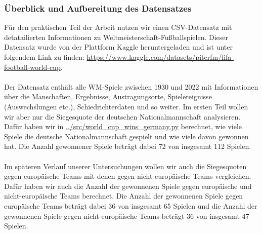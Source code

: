 \documentclass[a4paper,12pt]{article}
\begin{document}
\subsubsection{Überblick und Aufbereitung des Datensatzes}
Für den praktischen Teil der Arbeit nutzen wir einen CSV-Datensatz mit detatailierten Informationen zu Weltmeisterschaft-Fußballspielen. 
Dieser Datensatz wurde von der Plattform Kaggle heruntergeladen und ist unter folgendem Link zu finden: \url{https://www.kaggle.com/datasets/piterfm/fifa-football-world-cup}\parencite{FIFAWorldCupData}. \\\\
Der Datensatz enthält alle WM-Spiele zwischen 1930 und 2022 mit Informationen über die Manschaften, Ergebnisse, Austragungsorte, Spielereignisse (Auswechslungen etc.), Schiedrichterdaten und so weiter. Im ersten Teil wollen wir aber nur die Siegesquote der deutschen Nationalmannschaft analysieren. Dafür haben wir in \url{../src/world_cup_wins_germany.py} berechnet, wie viele Spiele die deutsche Nationalmannschaft gespielt und wie viele davon gewonnen hat. Die Anzahl gewonnener Spiele beträgt dabei 72 von insgesamt 112 Spielen. \\\\
Im späteren Verlauf unserer Untersuchungen wollen wir auch die Siegesquoten gegen europäische Teams mit denen gegen nicht-europäische Teams vergleichen. Dafür haben wir auch die Anzahl der gewonnenen Spiele gegen europäische und nicht-europäische Teams berechnet. Die Anzahl der gewonnenen Spiele gegen europäische Teams beträgt dabei 36 von insgesamt 65 Spielen und die Anzahl der gewonnenen Spiele gegen nicht-europäische Teams beträgt 36 von insgesamt 47 Spielen. \\\\
\end{document}
